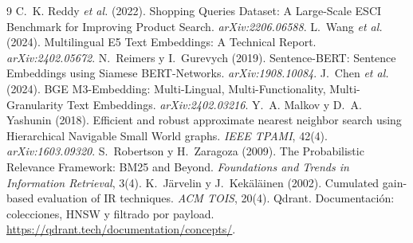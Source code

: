 \documentclass[10pt,twocolumn]{article}
\begin{document}
\balance
\begin{thebibliography}{9}\small
{} C.~K. Reddy \emph{et al.} (2022). Shopping Queries
Dataset: A Large-Scale ESCI Benchmark for Improving Product Search.
\emph{arXiv:2206.06588}.
 L.~Wang \emph{et al.} (2024). Multilingual E5 Text
Embeddings: A Technical Report. \emph{arXiv:2402.05672}.
 N.~Reimers y I.~Gurevych (2019). Sentence-BERT:
Sentence Embeddings using Siamese BERT-Networks. \emph{arXiv:1908.10084}.
 J.~Chen \emph{et al.} (2024). BGE M3-Embedding:
Multi-Lingual, Multi-Functionality, Multi-Granularity Text Embeddings.
\emph{arXiv:2402.03216}.
 Y.~A. Malkov y D.~A. Yashunin (2018). Efficient and
robust approximate nearest neighbor search using Hierarchical Navigable
Small World graphs. \emph{IEEE TPAMI}, 42(4). \emph{arXiv:1603.09320}.
 S.~Robertson y H.~Zaragoza (2009). The
Probabilistic Relevance Framework: BM25 and Beyond. \emph{Foundations and
Trends in Information Retrieval}, 3(4).
 K.~Järvelin y J.~Kekäläinen (2002). Cumulated
gain-based evaluation of IR techniques. \emph{ACM TOIS}, 20(4).
 Qdrant. Documentación: colecciones, HNSW y filtrado por
payload. \url{https://qdrant.tech/documentation/concepts/}.
\end{thebibliography}
\end{document}
